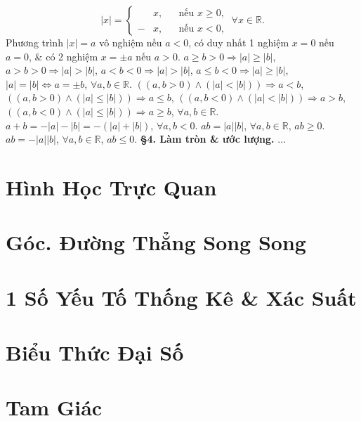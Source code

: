 \documentclass{article}
\numberwithin{equation}{section}
\begin{document}
\begin{equation*}
	|x| = \left\{\begin{split}
		&x,&&\mbox{nếu }x\ge 0,\\
		-&x,&&\mbox{nếu }x < 0,
	\end{split}\right.\ \forall x\in\mathbb{R}.
\end{equation*}
Phương trình $|x| = a$ vô nghiệm nếu $a < 0$, có duy nhất 1 nghiệm $x = 0$ nếu $a = 0$, \& có 2 nghiệm $x = \pm a$ nếu $a > 0$. $a\ge b > 0\Rightarrow|a|\ge |b|$, $a > b > 0\Rightarrow|a| > |b|$, $a < b < 0\Rightarrow|a| > |b|$, $a\le b < 0\Rightarrow|a|\ge |b|$, $|a| = |b|\Leftrightarrow a = \pm b$, $\forall a,b\in\mathbb{R}$. $((a,b > 0)\land(|a| < |b|))\Rightarrow a < b$, $((a,b > 0)\land(|a|\le |b|))\Rightarrow a\le b$, $((a,b < 0)\land(|a| < |b|))\Rightarrow a > b$, $((a,b < 0)\land(|a|\le|b|))\Rightarrow a\ge b$, $\forall a,b\in\mathbb{R}$. $a + b = -|a| - |b| = -(|a| + |b|)$, $\forall a,b < 0$. $ab = |a||b|$, $\forall a,b\in\mathbb{R}$, $ab\ge 0$. $ab = -|a||b|$, $\forall a,b\in\mathbb{R}$, $ab\le 0$. \textbf{\S4. Làm tròn \& ước lượng.} $\ldots$


\section{Hình Học Trực Quan}


\section{Góc. Đường Thẳng Song Song}


\section{1 Số Yếu Tố Thống Kê \& Xác Suất}


\section{Biểu Thức Đại Số}


\section{Tam Giác}


\printbibliography[heading=bibintoc]
	
\end{document}
